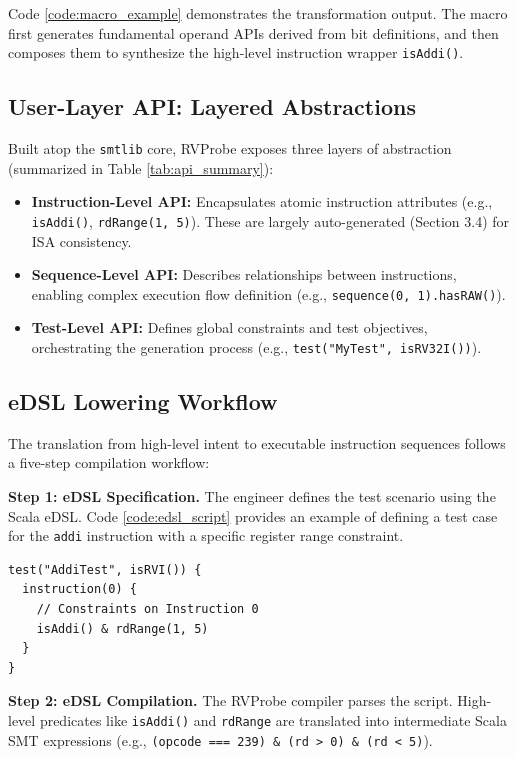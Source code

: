 \documentclass[sigconf]{acmart}
\begin{document}
Code \ref{code:macro_example} demonstrates the transformation output. The macro first generates fundamental operand APIs derived from bit definitions, and then composes them to synthesize the high-level instruction wrapper \texttt{isAddi()}.


\subsection{User-Layer API: Layered Abstractions}\label{Sec3.5}

Built atop the \texttt{smtlib} core, RVProbe exposes three layers of abstraction (summarized in Table \ref{tab:api_summary}):

\begin{itemize}
    \item \textbf{Instruction-Level API:} Encapsulates atomic instruction attributes (e.g., \texttt{isAddi()}, \texttt{rdRange(1, 5)}). These are largely auto-generated (Section 3.4) for ISA consistency.
    \item \textbf{Sequence-Level API:} Describes relationships between instructions, enabling complex execution flow definition (e.g., \texttt{sequence(0, 1).hasRAW()}).
    \item \textbf{Test-Level API:} Defines global constraints and test objectives, orchestrating the generation process (e.g., \texttt{test("MyTest", isRV32I())}).
\end{itemize}

\subsection{eDSL Lowering Workflow}\label{Sec3.6}

The translation from high-level intent to executable instruction sequences follows a five-step compilation workflow:

\textbf{Step 1: eDSL Specification.} The engineer defines the test scenario using the Scala eDSL. Code \ref{code:edsl_script} provides an example of defining a test case for the \texttt{addi} instruction with a specific register range constraint.

\begin{lstlisting}[caption={User eDSL Script Example}, label=code:edsl_script]
test("AddiTest", isRVI()) {
  instruction(0) {
    // Constraints on Instruction 0
    isAddi() & rdRange(1, 5) 
  }
}
\end{lstlisting}

\textbf{Step 2: eDSL Compilation.} The RVProbe compiler parses the script. High-level predicates like \texttt{isAddi()} and \texttt{rdRange} are translated into intermediate Scala SMT expressions (e.g., \texttt{(opcode === 239) \& (rd > 0) \& (rd < 5)}).
\end{document}
